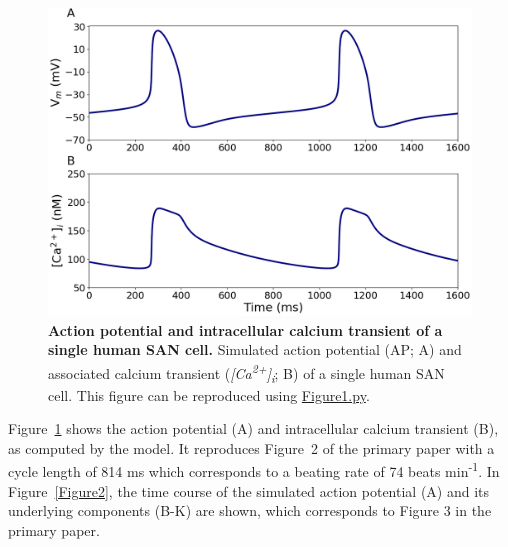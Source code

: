 \documentclass[fleqn,10pt]{physiome}
\begin{document}
\begin{figure}[htb]
\centering
\includegraphics[width=0.7\linewidth]{Figure1}
\caption{\textbf{Action potential and intracellular calcium transient of a single human SAN cell.}\newline
Simulated action potential (AP; A) and associated calcium transient (\textit{[Ca\textsuperscript{2+}]\textsubscript{i}}; B) of a single human SAN cell. This figure can be reproduced using \href{https://models.physiomeproject.org/workspace/648/rawfile/6784d6c3256c832dc98b2db42c85747ae2596518/Figure1.py}{Figure1.py}.}
\label{Figure1}
\end{figure}

Figure~\ref{Figure1} shows the action potential (A) and intracellular calcium transient (B), as computed by the model. It reproduces Figure~2 of the primary paper with a cycle length of 814 ms which corresponds to a beating rate of 74 beats min\textsuperscript{-1}. In Figure~\ref{Figure2}, the time course of the simulated action potential (A) and its underlying components (B-K) are shown, which corresponds to Figure 3 in the primary paper.
\end{document}
